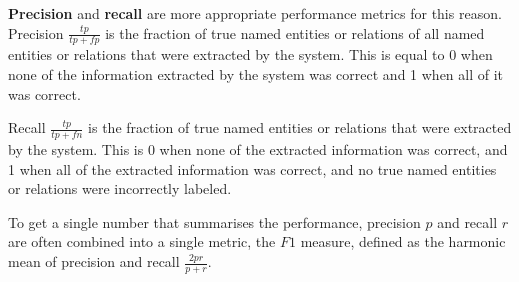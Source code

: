 \textbf{Precision} and \textbf{recall} are more appropriate performance metrics for this reason. Precision $\frac{tp}{tp + fp}$ is the fraction of true named entities or relations of all named entities or relations that were extracted by the system. This is equal to 0 when none of the information extracted by the system was correct and 1 when all of it was correct. 

Recall $\frac{tp}{tp + fn}$ is the fraction of true named entities or relations that were extracted by the system. This is 0 when none of the extracted information was correct, and 1 when all of the extracted information was correct, and no true named entities or relations were incorrectly labeled.

To get a single number that summarises the performance, precision $p$ and recall $r$ are often combined into a single metric, the $F1$ measure, defined as the harmonic mean of precision and recall $\frac{2pr}{p + r}$.